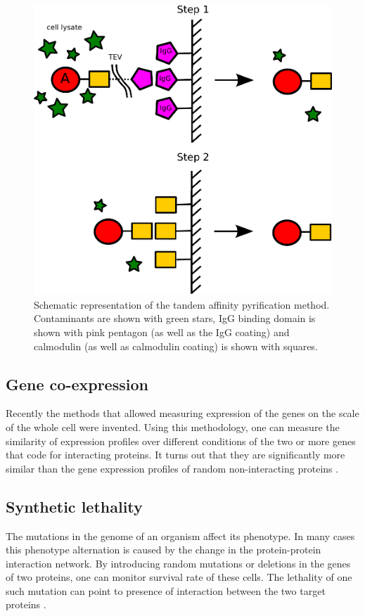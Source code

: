 \begin{figure}[H]
    \begin{centering}
      \includegraphics[width=0.5\linewidth]{Intro/Fig/TAP.pdf}  
      \caption[TAP-MS explanation]{Schematic representation of the tandem affinity pyrification method. Contaminants are shown with green stars, IgG binding domain is shown with 
      pink pentagon (as well as the IgG coating) and calmodulin (as well as calmodulin coating) is shown with squares.}
      \label{Fig:TAP}
    \end{centering}
\end{figure}

\subsection{Gene co-expression}
Recently the methods that allowed measuring expression of the genes on the scale of the whole cell were invented. Using this methodology,
one can measure the similarity of expression profiles over different conditions of the two or more genes that code for interacting proteins. 
It turns out that they are significantly more similar than the gene expression profiles of random non-interacting proteins \cite{jansen2002relating}.

\subsection{Synthetic lethality}
The mutations in the genome of an organism affect its phenotype. In many cases this phenotype alternation is caused by the change in the protein-protein interaction
network. By introducing random mutations or deletions in the genes of two proteins, one can monitor survival rate of these cells. The lethality of one such mutation 
can point to presence of interaction between the two target proteins \cite{ooi2006global}.

